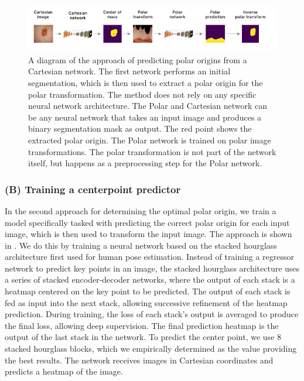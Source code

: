 	\begin{figure}[h!]
		\centering
		\includegraphics[width=\linewidth]{images/4/retraining-approach}
		\caption{A diagram of the approach of predicting polar origins from a Cartesian network. The first network performs an initial segmentation, which is then used to extract a polar origin for the polar transformation. The method does not rely on any specific neural network architecture. The Polar and Cartesian network can be any neural network that takes an input image and produces a binary segmentation mask as output. The red point shows the extracted polar origin. The Polar network is trained on polar image transformations. The polar transformation is not part of the network itself, but happens as a preprocessing step for the Polar network. \cite{bencevicTrainingPolarImage2021}}
		\label{fig:retraining-diagram}
	\end{figure}
	
    \subsubsection{(B) Training a centerpoint predictor}
    \label{centerpoint-approach}
    
In the second approach for determining the optimal polar origin, we train a model specifically tasked with predicting the correct
polar origin for each input 
image, which is then used to transform the input image. The approach is shown in . 
We do this by training a neural network based on the stacked hourglass architecture 
\cite{newellStackedHourglassNetworks2016} first used for human pose estimation. Instead of training a regressor network to
predict key points in an image, the stacked hourglass architecture uses a series of stacked encoder-decoder networks, where the output
of each stack is a heatmap centered on the key point to be predicted. The output of each stack is fed as input into the next stack, allowing 
successive refinement of the heatmap prediction. During training, the loss of each stack's output is averaged to produce the final loss, 
allowing deep supervision. The final prediction heatmap is the output of the last stack in the network. To predict the center point, 
we use 8 stacked hourglass blocks, which we empirically determined as the value providing the best results. The network receives images in Cartesian 
coordinates and predicts a heatmap of the image.

